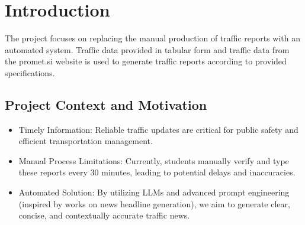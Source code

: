 \documentclass[fleqn,moreauthors,10pt]{ds_report}
\affiliation{\textit{Advisors: Slavko Žitnik}}
\begin{document}
\flushbottom 

\maketitle 

\thispagestyle{empty} 


\section*{Introduction}
The project focuses on replacing the manual production of traffic reports with an automated system. Traffic data provided in tabular form and traffic data from the promet.si website is used to generate traffic reports according to provided specifications.




\subsection{Project Context and Motivation}
\begin{itemize}
	\item Timely Information: Reliable traffic updates are critical for public safety and efficient transportation management.
	\item Manual Process Limitations: Currently, students manually verify and type these reports every 30 minutes, leading to potential delays and inaccuracies.
	\item Automated Solution: By utilizing LLMs and advanced prompt engineering (inspired by works on news headline generation), we aim to generate clear, concise, and contextually accurate traffic news.
\end{itemize}
\end{document}
